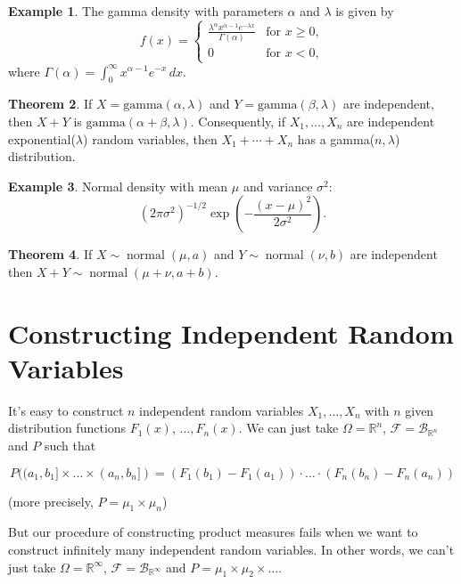\documentclass{article}
\theoremstyle{definition}
\newtheorem{theorem}{Theorem}[section]
\newtheorem{example}[theorem]{Example}
\begin{document}
\begin{example}
    The gamma density with parameters \( \alpha \) and \( \lambda \) is given by
    \[
        f(x) =
        \begin{cases}
            \frac{\lambda^\alpha x^{\alpha-1} e^{-\lambda x}}{\Gamma(\alpha)} & \text{for } x \geq 0, \\
            0                                                                 & \text{for } x < 0,
        \end{cases}
    \]
    where \( \Gamma(\alpha) = \int_0^\infty x^{\alpha-1} e^{-x} \, dx \).
\end{example}

\begin{theorem}
    If \( X = \text{gamma}(\alpha, \lambda) \) and \( Y = \text{gamma}(\beta, \lambda) \) are independent, then \( X + Y \) is \( \text{gamma}(\alpha + \beta, \lambda) \). Consequently, if \( X_1, \dots, X_n \) are independent exponential(\( \lambda \)) random variables, then \( X_1 + \cdots + X_n \) has a gamma(\( n, \lambda \)) distribution.
\end{theorem}

\begin{example}
    Normal density with mean $\mu$ and variance $\sigma^2$:
    \[
        (2\pi\sigma^2)^{-1/2} \exp\left(-\frac{(x - \mu)^2}{2\sigma^2}\right).
    \]
\end{example}

\begin{theorem}
    If $X \sim \operatorname{normal}(\mu, a)$ and $Y \sim \operatorname{normal}(\nu, b)$ are independent then $X + Y \sim \operatorname{normal}(\mu + \nu, a + b)$.
\end{theorem}

\section{Constructing Independent Random Variables}

It's easy to construct $n$ independent random variables $X_1, \dots, X_n$ with $n$ given distribution functions $F_1(x)$, $ \dots, F_n(x)$. We can just take $\Omega = \mathbb{R}^n$, $\mathcal{F} = \mathcal{B}_{\mathbb{R}^n}$ and $P$ such that

$$ P((a_1, b_1] \times \dots \times (a_n, b_n]) = (F_1(b_1) - F_1(a_1)) \cdot \dots \cdot (F_n(b_n) - F_n(a_n))$$

(more precisely, $P = \mu_1 \times \mu_n$)

But our procedure of constructing product measures fails when we want to construct infinitely many independent random variables. In other words, we can't just take $\Omega = \mathbb{R}^\infty$, $\mathcal{F} = \mathcal{B}_{\mathbb{R}^\infty}$ and $P = \mu_1 \times \mu_2 \times \dots$.
\end{document}
